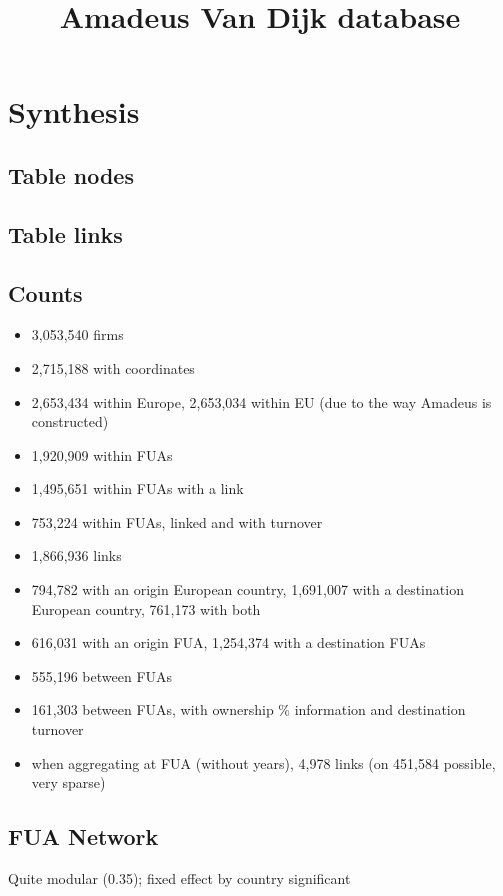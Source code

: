 \documentclass[10pt]{article}
\begin{document}
\title{Amadeus Van Dijk database}


\maketitle



\section*{Synthesis}

\subsection*{Table nodes}


\subsection*{Table links}


\subsection*{Counts}

\begin{itemize}
    \item 3,053,540 firms
    \item 2,715,188 with coordinates
    \item 2,653,434 within Europe, 2,653,034 within EU (due to the way Amadeus is constructed)
    \item 1,920,909 within FUAs
    \item 1,495,651 within FUAs with a link
    \item 753,224 within FUAs, linked and with turnover
\end{itemize}

\begin{itemize}
    \item 1,866,936 links
    \item 794,782 with an origin European country, 1,691,007 with a destination European country, 761,173 with both %
    \item 616,031 with an origin FUA, 1,254,374 with a destination FUAs
    \item 555,196 between FUAs %
    \item 161,303 between FUAs, with ownership \% information and destination turnover
    \item when aggregating at FUA (without years), 4,978 links (on 451,584 possible, very sparse)
\end{itemize}


\subsection*{FUA Network}

Quite modular (0.35); fixed effect by country significant
\end{document}
